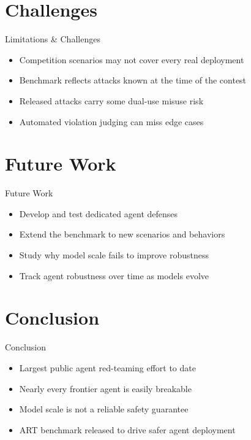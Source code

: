 \documentclass[10pt]{beamer}
\begin{document}
\section{Challenges}
\begin{frame}{Limitations \& Challenges}
\begin{itemize}
  \item Competition scenarios may not cover every real deployment
  \item Benchmark reflects attacks known at the time of the contest
  \item Released attacks carry some dual-use misuse risk
  \item Automated violation judging can miss edge cases
\end{itemize}
\end{frame}

\section{Future Work}
\begin{frame}{Future Work}
\begin{itemize}
  \item Develop and test dedicated agent defenses
  \item Extend the benchmark to new scenarios and behaviors
  \item Study why model scale fails to improve robustness
  \item Track agent robustness over time as models evolve
\end{itemize}
\end{frame}

\section{Conclusion}
\begin{frame}{Conclusion}
\begin{itemize}
  \item Largest public agent red-teaming effort to date
  \item Nearly every frontier agent is easily breakable
  \item Model scale is not a reliable safety guarantee
  \item ART benchmark released to drive safer agent deployment
\end{itemize}
\end{frame}
\end{document}
